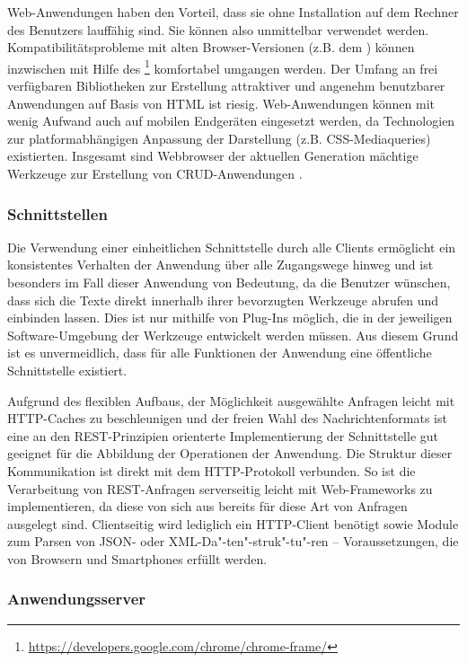 Web-Anwendungen haben den Vorteil, dass sie ohne Installation auf dem Rechner des Benutzers lauffähig sind. Sie können also unmittelbar verwendet werden. Kompatibilitätsprobleme mit alten Browser-Versionen (z.B. dem ) können inzwischen mit Hilfe des \footnote{\url{https://developers.google.com/chrome/chrome-frame/}} komfortabel umgangen werden. Der Umfang an frei verfügbaren Bibliotheken zur Erstellung attraktiver und angenehm benutzbarer Anwendungen auf Basis von HTML ist riesig. Web-Anwendungen können mit wenig Aufwand auch auf mobilen Endgeräten eingesetzt werden, da Technologien zur platformabhängigen Anpassung der Darstellung (z.B. CSS-Mediaqueries) existierten. Insgesamt sind Webbrowser der aktuellen Generation mächtige Werkzeuge zur Erstellung von CRUD-Anwendungen \cite{ms-key-software-development-trends} .

\subsubsection{Schnittstellen} 

Die Verwendung einer einheitlichen Schnittstelle durch alle Clients ermöglicht ein konsistentes Verhalten der Anwendung über alle Zugangswege hinweg und ist besonders im Fall dieser Anwendung von Bedeutung, da die Benutzer wünschen, dass sich die Texte direkt innerhalb ihrer bevorzugten Werkzeuge abrufen und einbinden lassen. Dies ist nur mithilfe von Plug-Ins möglich, die in der jeweiligen Software-Umgebung der Werkzeuge entwickelt werden müssen. Aus diesem Grund ist es unvermeidlich, dass für alle Funktionen der Anwendung eine öffentliche Schnittstelle existiert.

Aufgrund des flexiblen Aufbaus, der Möglichkeit ausgewählte Anfragen leicht mit HTTP-Caches zu beschleunigen und der freien Wahl des Nachrichtenformats ist eine an den REST-Prinzipien orienterte Implementierung der Schnittstelle gut geeignet für die Abbildung der Operationen der Anwendung. Die Struktur dieser Kommunikation ist direkt mit dem HTTP-Protokoll verbunden. So ist die Verarbeitung von REST-Anfragen serverseitig leicht mit Web-Frameworks zu implementieren, da diese von sich aus bereits für diese Art von Anfragen ausgelegt sind. Clientseitig wird lediglich ein HTTP-Client benötigt sowie Module zum Parsen von JSON- oder XML-Da"-ten"-struk"-tu"-ren -- Voraussetzungen, die von Browsern und Smartphones erfüllt werden. 

\subsubsection{Anwendungsserver}


